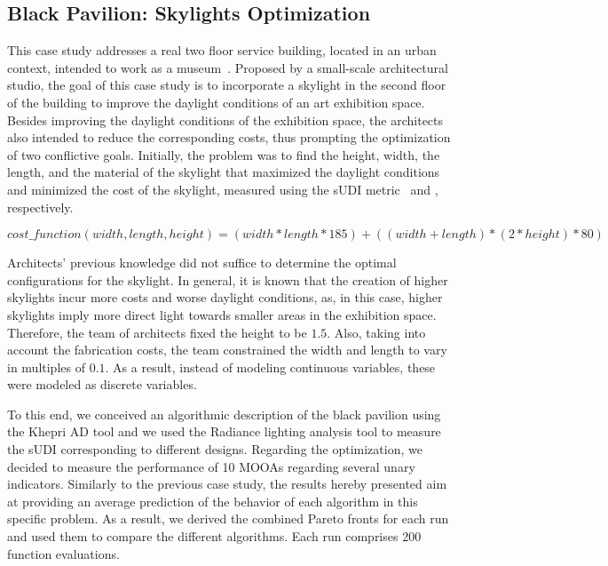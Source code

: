 \subsection{Black Pavilion: Skylights Optimization}

This case study addresses a real two floor service building, located in an urban context, intended to work as a museum~\cite{Caetano2018,IP2019MOO}. Proposed by a small-scale architectural studio, the goal of this case study is to incorporate a skylight in the second floor of the building to improve the daylight conditions of an art exhibition space. Besides improving the daylight conditions of the exhibition space, the architects also intended to reduce the corresponding costs, thus prompting the optimization of two conflictive goals. Initially, the problem was to find the height, width, the length, and the material of the skylight that maximized the daylight conditions and minimized the cost of the skylight, measured using the \ac{sUDI} metric~\cite{Nabil2006} and  , respectively. 

\begin{equation} \label{eq:costanalysis}
cost\_function(width, length, height) = (width * length * 185) + ((width + length) * ( 2 * height) * 80)
\end{equation}

Architects' previous knowledge did not suffice to determine the optimal configurations for the skylight. In general, it is known that the creation of higher skylights incur more costs and worse daylight conditions, as, in this case, higher skylights imply more direct light towards smaller areas in the exhibition space. Therefore, the team of architects fixed the height to be $1.5$\metre. Also, taking into account the fabrication costs, the team constrained the width and length to vary in multiples of $0.1$\metre. As a result, instead of modeling continuous variables, these were modeled as discrete variables.

To this end, we conceived an algorithmic description of the black pavilion using the Khepri \ac{AD} tool and we used the Radiance lighting analysis tool to measure the \ac{sUDI} corresponding to different designs. Regarding the optimization, we decided to measure the performance of 10 \acp{MOOA} regarding several unary indicators. Similarly to the previous case study, the results hereby presented aim at providing an average prediction of the behavior of each algorithm in this specific problem. As a result, we derived the combined Pareto fronts for each run and used them to compare the different algorithms. Each run comprises 200 function evaluations.

